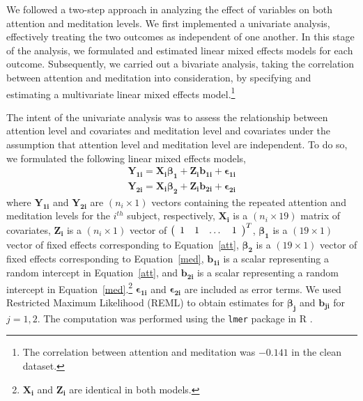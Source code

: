 \documentclass{article}[12pt]
\begin{document}
We followed a two-step approach in analyzing the effect of variables on both attention and meditation levels. We first implemented a univariate analysis, effectively treating the two outcomes as independent of one another. In this stage of the analysis, we formulated and estimated linear mixed effects models for each outcome. Subsequently, we carried out a bivariate analysis, taking the correlation between attention and meditation into consideration, by specifying and estimating a multivariate linear mixed effects model.\footnote{The correlation between attention and meditation was $-0.141$ in the clean dataset.}

The intent of the univariate analysis was to assess the relationship between attention level and covariates and meditation level and covariates under the assumption that attention level and meditation level are independent. To do so, we formulated the following linear mixed effects models,
\begin{align}
\mathbf{Y_{1i}} = \mathbf{X_{i}} \boldsymbol{\beta_{1}} + \mathbf{Z_{i}} \boldsymbol{b_{1i}} \label{att}
+ \boldsymbol{\epsilon_{1i}} \\
\mathbf{Y_{2i}} = \mathbf{X_{i}} \boldsymbol{\beta_{2}} + \mathbf{Z_{i}} \boldsymbol{b_{2i}}
+ \boldsymbol{\epsilon_{2i}} \label{med}
\end{align}
where $\mathbf{Y_{1i}}$ and $\mathbf{Y_{2i}}$ are $(n_i \times 1)$ vectors containing the repeated attention and meditation levels for the $i^{th}$ subject, respectively, $\mathbf{X_{i}}$ is a $(n_i \times 19)$ matrix of covariates, $\mathbf{Z_{i}}$ is a $(n_i \times 1)$ vector of 
$\left(\begin{array}{c c c c}
1 & 1 & \dots & 1
\end{array}\right)^T$, $\boldsymbol{\beta_{1}}$ is a $(19 \times 1)$ vector of fixed effects corresponding to Equation~\ref{att}, $\boldsymbol{\beta_{2}}$ is a $(19 \times 1)$ vector of fixed effects corresponding to Equation~\ref{med}, $\boldsymbol{b_{1i}}$ is a scalar representing a random intercept in Equation~\ref{att}, and $\boldsymbol{b_{2i}}$ is a scalar representing a random intercept in Equation~\ref{med}.\footnote{$\mathbf{X_{i}}$ and $\mathbf{Z_{i}}$ are identical in both models.} $\boldsymbol{\epsilon_{1i}}$ and $\boldsymbol{\epsilon_{2i}}$ are included as error terms. We used Restricted Maximum Likelihood (REML) to obtain estimates for $\boldsymbol{\beta_{j}}$ and $\boldsymbol{b_{ji}}$ for $j = 1,2$. The computation was performed using the \texttt{lmer} package in R  \cite{lme4}.
\end{document}
